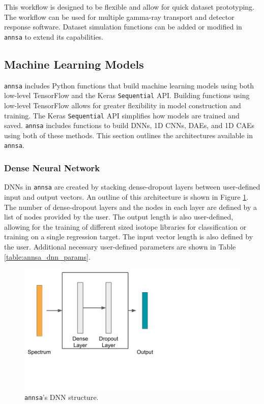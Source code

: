 This workflow is designed to be flexible and allow for quick dataset prototyping. The workflow can be used for multiple gamma-ray transport and detector response software. Dataset simulation functions can be added or modified in \verb|annsa| to extend its capabilities.




\subsection{Machine Learning Models}

\verb|annsa| includes Python functions that build machine learning models using both low-level TensorFlow and the Keras \verb|Sequential| API. Building functions using low-level TensorFlow allows for greater flexibility in model construction and training. The Keras \verb|Sequential| API simplifies how models are trained and saved. \verb|annsa| includes functions to build DNNs, 1D CNNs, DAEs, and 1D CAEs using both of these methods. This section outlines the architectures available in \verb|annsa|.

\subsubsection{Dense Neural Network}

DNNs in \verb|annsa| are created by stacking dense-dropout layers between user-defined input and output vectors. An outline of this architecture is shown in Figure \ref{fig:annsa_dnn}. The number of dense-dropout layers and the nodes in each layer are defined by a list of nodes provided by the user. The output length is also user-defined, allowing for the training of different sized isotope libraries for classification or training on a single regression target. The input vector length is also defined by the user. Additional necessary user-defined parameters are shown in Table \ref{table:annsa_dnn_params}.

\begin{figure}[H]
\centering
\includegraphics[trim=0 110 380 0,clip,width=0.6\linewidth]{images/annsa_dnn.png}
\caption{\texttt{annsa}'s DNN structure.}
\label{fig:annsa_dnn}
\end{figure}

